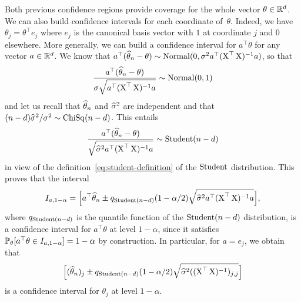 Both previous confidence regions provide coverage for the whole vector $\theta \in \R^d$.
We can also build confidence intervals for each coordinate of~$\theta$.
Indeed, we have $\theta_j = \theta^\top e_j$ where $e_j$ is the canonical basis vector with $1$ at coordinate $j$ and $0$ elsewhere. 
More generally, we can build a confidence interval for $a^\top \theta$ for any vector $a \in \R^d$.
We know that $a^\top(\wh \theta_n - \theta) \sim \nor(0, \sigma^2 a^\top (\bX^\top \bX)^{-1} a)$, so that
\begin{equation*}
	\frac{a^\top(\wh \theta_n - \theta)}{\sigma \sqrt{a^\top (\bX^\top \bX)^{-1} a}} \sim \nor(0, 1)
\end{equation*}
and let us recall that $\wh \theta_n$ and $\wh \sigma^2$ are independent and that $(n - d) \wh \sigma^2 / \sigma^2 \sim \chisq(n - d)$.
This entails
\begin{equation}
	\label{eq:ci-construction-gaussian-linear-model}
	\frac{a^\top(\wh \theta_n - \theta)}{\sqrt{\wh \sigma^2 a^\top (\bX^\top \bX)^{-1} a}} 
	\sim \stu(n - d)
\end{equation}
in view of the definition~\eqref{eq:student-definition} of the $\stu$ distribution.%
This proves that the interval
\begin{equation*}
	I_{a, 1 - \alpha} = \Big[a^\top \wh \theta_n \pm q_{\stu(n-d)}(1 - \alpha/2) 
	\sqrt{\wh \sigma^2 a^\top (\bX^\top \bX)^{-1} a} \Big],
\end{equation*}
where $q_{\stu(n-d)}$ is the quantile function of the $\stu(n-d)$ distribution,
is a confidence interval for $a^\top \theta$ at level $1 - \alpha$, since it satisfies $\P_\theta[ a^\top \theta \in I_{a, 1 - \alpha}] = 1 - \alpha$ by construction.%
In particular, for $a = e_j$, we obtain that
\begin{equation}
	\label{eq:ci-gaussian-linear-coordinate}
	\Big[  (\wh \theta_n)_j \pm q_{\stu(n-d)}(1 - \alpha/2) \sqrt{\wh \sigma^2 ((\bX^\top \bX)^{-1})_{j, j}} \Big]
\end{equation}
is a confidence interval for $\theta_j$ at level $1 - \alpha$.

